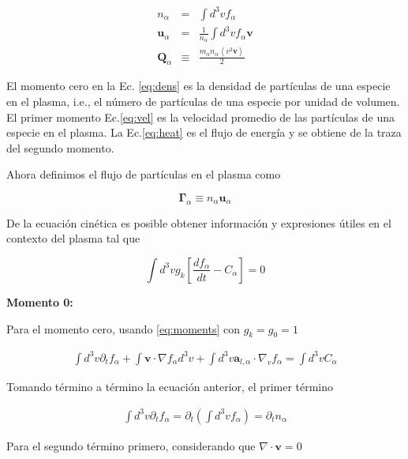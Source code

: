   \begin{eqnarray}
    n_\alpha &=& \int d^3v f_\alpha \label{eq:dens}\\
    \textbf{u}_{\alpha} &=& \frac{1}{n_\alpha}\int d^3v f_\alpha\textbf{v} \label{eq:vel} \\
    \textbf{Q}_\alpha &\equiv& \frac{m_\alpha n_\alpha \left<v^2\textbf{v}\right>}{2}\label{eq:heat}
  \end{eqnarray}

El momento cero en la Ec. \eqref{eq:dens} es la densidad de part\'iculas de una especie en el plasma, i.e., el n\'umero de part\'iculas de una especie por unidad de volumen. El primer momento Ec.\eqref{eq:vel} es la velocidad promedio de las part\'iculas de una especie en el plasma. La Ec.\eqref{eq:heat} es el flujo de energ\'ia y se obtiene de la traza del segundo momento. 

  Ahora definimos el flujo de part\'iculas en el plasma como 
  
  \begin{equation}
    \pmb{\Gamma}_\alpha \equiv n_\alpha\textbf{u}_\alpha
  \end{equation}

  De la ecuaci\'on cin\'etica es posible obtener informaci\'on y expresiones \'utiles en el contexto del plasma tal que\cite{freidberg2014}

  \begin{equation}\label{eq:moments}
    \int d^3v g_k\left[\frac{df_\alpha}{dt} - C_\alpha\right] = 0
  \end{equation}

  
\textbf{Momento 0:}
		
Para el momento cero, usando \eqref{eq:moments} con $g_k = g_0 = 1$
		
	  \begin{eqnarray*}
      \int d^3v\partial_t f_\alpha + \int \textbf{v}\cdot \nabla f_\alpha d^3v + \int d^3v \textbf{a}_{l,\alpha} \cdot\nabla_v f_\alpha = \int d^3v C_\alpha
		\end{eqnarray*}
		
		Tomando t\'ermino a t\'ermino la ecuaci\'on anterior, el primer t\'ermino 
		
		\begin{eqnarray*}
				\int d^3v \partial_t f_\alpha = \partial_t\left(\int d^3v f_\alpha\right) =  \partial_t n_\alpha
		\end{eqnarray*}
		
		Para el segundo t\'ermino primero, considerando que $\nabla\cdot\textbf{v} = 0$
	
